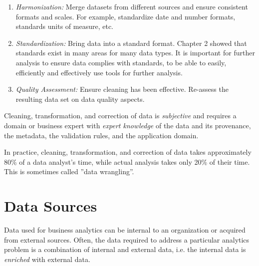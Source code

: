 \begin{enumerate}
\item \emph{Harmonization:} Merge datasets from different sources and ensure consistent formats and scales. For example, standardize date and number formats, standards units of measure, etc.

\item \emph{Standardization:} Bring data into a standard format. Chapter 2 showed that standards exist in many areas for many data types. It is important for further analysis to ensure data complies with standards, to be able to easily, efficiently and effectively use tools for further analysis. 

\item \emph{Quality Assessment:} Ensure cleaning has been effective. Re-assess the resulting data set on data quality aspects.
\end{enumerate}

\begin{tcolorbox}[colback=alert]
Cleaning, transformation, and correction of data is \emph{subjective} and requires a domain or business expert with  \emph{expert knowledge} of the data and its provenance, the metadata, the validation rules, and the application domain.
\end{tcolorbox}

\begin{tcolorbox}[colback=alert]
In practice, cleaning, transformation, and correction of data takes approximately 80\% of a data analyst's time, while actual analysis takes only 20\% of their time. This is sometimes called ''data wrangling''.
\end{tcolorbox}

\section{Data Sources}

Data used for business analytics can be internal to an organization or acquired from external sources. Often, the data required to address a particular analytics problem is a combination of internal and external data, i.e. the internal data is \emph{enriched} with external data. 

